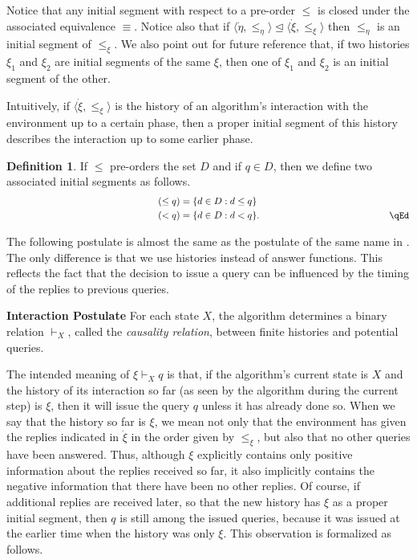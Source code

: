 \documentclass{LMCS}
\theoremstyle{definition}
\newtheorem{df}[thm]{Definition}
\newenvironment{unn}[1]{\bigskip\noindent\textbf{#1}\quad}{\par\bigskip}
\newcommand{\ans}{\dot}
\newcommand{\sq}[1]{\ensuremath{\langle#1\rangle}}
\newcommand{\initeq}{\unlhd}
\begin{document}
Notice that any initial segment with respect to a pre-order $\leq$ is
closed under the associated equivalence $\equiv$.  Notice also that if
$\sq{\ans\eta,\leq_\eta}\initeq\sq{\ans\xi,\leq_\xi}$ then $\leq_\eta$
is an initial segment of $\leq_\xi$.  We also point out for future
reference that, if two histories $\xi_1$ and $\xi_2$ are initial
segments of the same $\xi$, then one of $\xi_1$ and $\xi_2$ is an
initial segment of the other.

Intuitively, if \sq{{\ans\xi},\leq_\xi} is the history of an algorithm's
interaction with the environment up to a certain phase, then a proper
initial segment of this history describes the interaction up to some
earlier phase.

\begin{df}
  If $\leq$ pre-orders the set $D$ and if $q\in D$, then we define two
  associated initial segments as follows.
  \begin{align*}
    (\leq q)&=\{d\in D:d\leq q\}\\
    \hbox to 159 pt{\hfill}(<q)&=\{d\in D:d<q\}.\hbox to 158 pt{\hfill\qEd}
  \end{align*}\end{df}

The following postulate is almost the same as the postulate of the
same name in \cite{oa1}.  The only difference is that we use histories
instead of answer functions.  This reflects the fact that the decision
to issue a query can be influenced by the timing of the replies to
previous queries.

\begin{unn}{Interaction Postulate}
For each state $X$, the algorithm determines a binary relation
  $\vdash_X$, called the \emph{causality relation}, between finite
  histories and potential queries.
\end{unn}

The intended meaning of $\xi\vdash_Xq$ is that, if the algorithm's
current state is $X$ and the history of its interaction so far (as
seen by the algorithm during the current step) is $\xi$, then it will
issue the query $q$ unless it has already done so.  When we say that
the history so far is $\xi$, we mean not only that the environment has
given the replies indicated in $\ans\xi$ in the order given by
$\leq_\xi$, but also that no other queries have been answered.  Thus,
although $\xi$ explicitly contains only positive information about the
replies received so far, it also implicitly contains the negative
information that there have been no other replies.  Of course, if
additional replies are received later, so that the new history has
$\xi$ as a proper initial segment, then $q$ is still among the issued
queries, because it was issued at the earlier time when the history
was only $\xi$.  This observation is formalized as follows.
\end{document}
